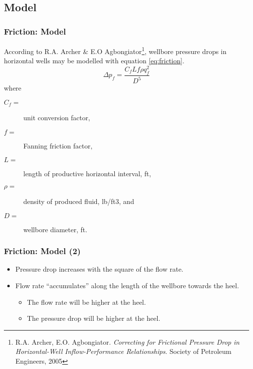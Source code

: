 \subsection{Model}
\begin{frame}
    \frametitle{Friction: Model}
    According to R.A. Archer \& E.O Agbongiator\footnote{R.A. Archer, E.O. Agbongiator. \emph{Correcting for Frictional Pressure Drop in Horizontal-Well Inflow-Performance Relationships}. Society of Petroleum Engineers, 2005}, wellbore pressure drops in horizontal wells may be modelled with equation \ref{eq:friction}.
    \begin{equation}
        \label{eq:friction}
        \Delta p_f = \frac{C_f L f \rho q_f^2}{D^5}
    \end{equation}
    where
    \begin{description}
        \item[$C_f=$] unit conversion factor, 
        \item[$f=$] Fanning friction factor,
        \item[$L=$] length of productive horizontal interval, ft,
        \item[$\rho=$] density of produced fluid, lb/ft3, and
        \item[$D=$] wellbore diameter, ft.
    \end{description}
\end{frame}



\begin{frame}
    \frametitle{Friction: Model (2)}
    \begin{itemize}
            \item Pressure drop increases with the square of the flow rate.
            \item Flow rate ``accumulates'' along the length of the wellbore towards the heel.
            \begin{itemize}
                \item The flow rate will be higher at the heel.
                \item The pressure drop will be higher at the heel.
            \end{itemize}
        \end{itemize}    
\end{frame}
